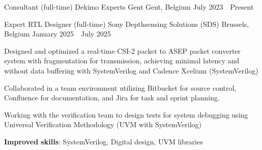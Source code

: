 


\begin{cventries}

  \cventry
  {Consultant (full-time)} %
  {Dekimo Experts Gent} %
  {Gent, Belgium} %
  {July 2023~\textendash~Present} %
  {}

  \cventry
  {Expert RTL Designer (full-time)} %
  {Sony Depthsensing Solutions (SDS)} %
  {Brussels, Belgium} %
  {January 2025~\textendash~July 2025} %
  {
    \begin{cvitems} %
      \item {Designed and optimized a real-time CSI-2 packet to ASEP packet converter system with fragmentation for transmission, achieving minimal latency and without data buffering with SystemVerilog and Cadence Xcelium (SystemVerilog)}
      \item {Collaborated in a team environment utilizing Bitbucket for source control, Confluence for documentation, and Jira for task and sprint planning.}
      \item {Working with the verification team to design tests for system debugging using Universal Verification Methodology (UVM with SystemVerilog)}
      \item {\textbf{Improved skills}: SystemVerilog, Digital design, UVM libraries}
    \end{cvitems}
  }


\end{cventries}
